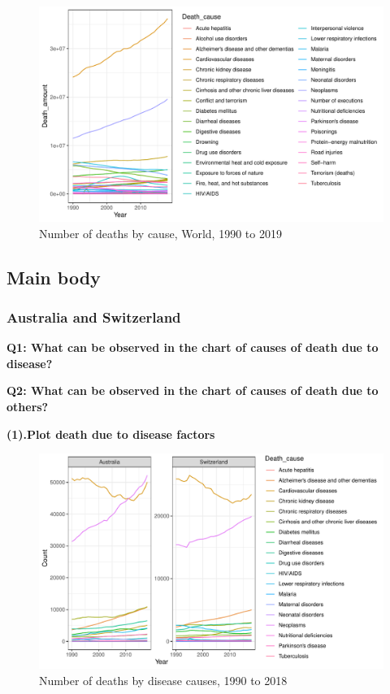 \documentclass[11pt,a4paper,]{article}
\begin{document}
\begin{figure}
\centering
\includegraphics{Assignment4_files/figure-latex/worldplot-1.pdf}
\caption{\label{fig:worldplot}Number of deaths by cause, World, 1990 to 2019}
\end{figure}

\clearpage

\hypertarget{main-body}{%
\subsection{Main body}\label{main-body}}

\hypertarget{australia-and-switzerland}{%
\subsubsection{Australia and Switzerland}\label{australia-and-switzerland}}

\textbf{Q1: What can be observed in the chart of causes of death due to disease?}

\textbf{Q2: What can be observed in the chart of causes of death due to others?}

\textbf{(1).Plot death due to disease factors}

\begin{figure}
\centering
\includegraphics{Assignment4_files/figure-latex/diseaseplot-1.pdf}
\caption{\label{fig:diseaseplot}Number of deaths by disease causes, 1990 to 2018}
\end{figure}
\end{document}
